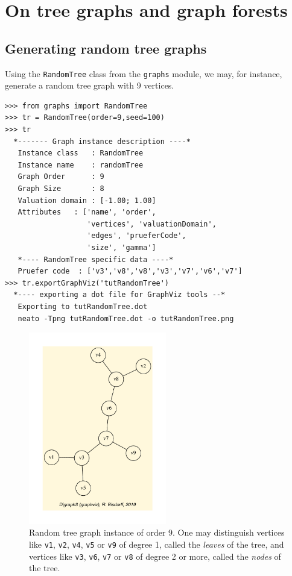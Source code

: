 \chapter{On tree graphs and graph forests}
\label{sec:22}


\abstract{}

\section{Generating random tree graphs}
\label{sec:22.1}

Using the \texttt{RandomTree} class from the \texttt{graphs} module, we may, for instance, generate a random tree graph with 9 vertices.
\begin{lstlisting}[caption={Generating a random tree graph.},label=list:22.1]
>>> from graphs import RandomTree
>>> tr = RandomTree(order=9,seed=100)
>>> tr
  *------- Graph instance description ----*
   Instance class   : RandomTree
   Instance name    : randomTree
   Graph Order      : 9
   Graph Size       : 8
   Valuation domain : [-1.00; 1.00]
   Attributes   : ['name', 'order',
                   'vertices', 'valuationDomain',
                   'edges', 'prueferCode',
                   'size', 'gamma']
   *---- RandomTree specific data ----*
   Pruefer code  : ['v3','v8','v8','v3','v7','v6','v7']
>>> tr.exportGraphViz('tutRandomTree')
  *---- exporting a dot file for GraphViz tools --*
   Exporting to tutRandomTree.dot
   neato -Tpng tutRandomTree.dot -o tutRandomTree.png
\end{lstlisting}
\begin{figure}[h]
\sidecaption[t]
\includegraphics[width=6cm]{Figures/tutRandomTree.pdf}
\caption{Random tree graph instance of order 9. One may distinguish vertices like \texttt{v1}, \texttt{v2}, \texttt{v4}, \texttt{v5} or \texttt{v9}  of degree 1, called the \emph{leaves} of the tree, and vertices like \texttt{v3}, \texttt{v6}, \texttt{v7} or \texttt{v8} of degree 2 or more, called the \emph{nodes} of the tree.} 
\label{fig:22.1}       %
\end{figure}

